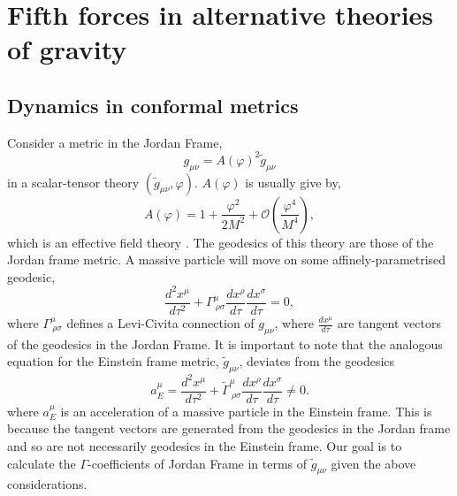 \chapter{Fifth forces in alternative theories of gravity}\label{appendixConformalDynamics}
\section{Dynamics in conformal metrics}
Consider a metric in the Jordan Frame,
\begin{equation}
g_{\mu\nu} = A(\varphi)^2\tilde{g} _{\mu\nu}
\end{equation}
in a scalar-tensor theory $(\tilde{g}_{\mu\nu},\varphi)$. $A(\varphi)$ is usually give by,
\begin{equation}
    A(\varphi) = 1 + \frac{\varphi^2}{2M^2} + \mathcal{O}\left(\frac{\varphi^4}{M^4}\right),
\end{equation}
which is an effective field theory \citep{darkdomains}. The geodesics of this theory are those of the Jordan frame metric. A massive particle will move on some affinely-parametrised geodesic, 
\begin{equation}
    \frac{d^2x^{\mu}}{d\tau^2} + \Gamma^{\mu}_{\ \rho\sigma}\frac{dx^{\rho}}{d\tau}\frac{dx^{\sigma}}{d\tau} = 0,
\end{equation}
where $\Gamma^{\mu}_{\ \rho\sigma}$ defines a Levi-Civita connection of $g_{\mu\nu}$, where $\frac{dx^{\mu}}{d\tau}$ are tangent vectors of the geodesics in the Jordan Frame. It is important to note that the analogous equation for the Einstein frame metric, $\tilde{g}_{\mu\nu}$, deviates from the geodesics
\begin{equation}
        a_E^{\mu} = \frac{d^2x^{\mu}}{d\tau^2} + \tilde{\Gamma}^{\mu}_{\ \rho\sigma}\frac{dx^{\rho}}{d\tau}\frac{dx^{\sigma}}{d\tau} \neq 0.
\end{equation}
where $a_E^{\mu}$ is an acceleration of a massive particle in the Einstein frame. This is because the tangent vectors are generated from the geodesics in the Jordan frame and so are not necessarily geodesics in the Einstein frame. Our goal is to calculate the $\Gamma$-coefficients of Jordan Frame in terms of $\tilde{g}_{\mu\nu}$ given the above considerations.

